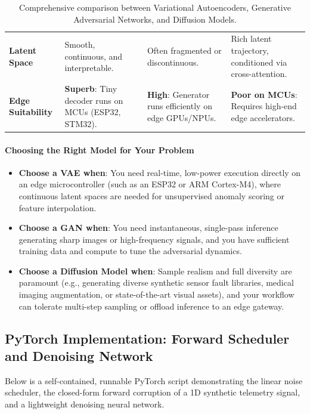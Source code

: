 \begin{table}[htbp]
\begin{tabular}{p{2.8cm} p{3.8cm} p{3.8cm} p{3.8cm}}
\textbf{Latent Space} & Smooth, continuous, and interpretable. & Often fragmented or discontinuous. & Rich latent trajectory, conditioned via cross-attention. \\
\textbf{Edge Suitability} & \textbf{Superb}: Tiny decoder runs on MCUs (ESP32, STM32). & \textbf{High}: Generator runs efficiently on edge GPUs/NPUs. & \textbf{Poor on MCUs}: Requires high-end edge accelerators. \\
\bottomrule
\end{tabular}
\caption{Comprehensive comparison between Variational Autoencoders, Generative Adversarial Networks, and Diffusion Models.}\label{tab:generative_comparison}
\end{table}

\paragraph{Choosing the Right Model for Your Problem}
\begin{itemize}
    \item \textbf{Choose a VAE when}: You need real-time, low-power execution directly on an edge microcontroller (such as an ESP32 or ARM Cortex-M4), where continuous latent spaces are needed for unsupervised anomaly scoring or feature interpolation.
    \item \textbf{Choose a GAN when}: You need instantaneous, single-pass inference generating sharp images or high-frequency signals, and you have sufficient training data and compute to tune the adversarial dynamics.
    \item \textbf{Choose a Diffusion Model when}: Sample realism and full diversity are paramount (e.g., generating diverse synthetic sensor fault libraries, medical imaging augmentation, or state-of-the-art visual assets), and your workflow can tolerate multi-step sampling or offload inference to an edge gateway.
\end{itemize}

\subsection{PyTorch Implementation: Forward Scheduler and Denoising Network}\label{subsec:diffusion_code}

Below is a self-contained, runnable PyTorch script demonstrating the linear noise scheduler, the closed-form forward corruption of a 1D synthetic telemetry signal, and a lightweight denoising neural network.


